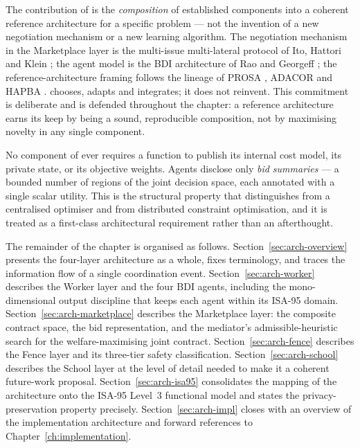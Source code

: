\begin{description}[leftmargin=1.4em,style=nextline]
  \item[Composition over invention.] The contribution of \NEXUS{} is
    the \emph{composition} of established components into a coherent
    reference architecture for a specific problem --- not the invention
    of a new negotiation mechanism or a new learning algorithm. The
    negotiation mechanism in the Marketplace layer is the multi-issue
    multi-lateral protocol of Ito, Hattori and Klein
    \cite{ito2007multiissue}; the agent model is the BDI architecture
    of Rao and Georgeff \cite{rao1995bdi}; the reference-architecture
    framing follows the lineage of PROSA \cite{vanbrussel1998prosa},
    ADACOR \cite{leitao2007holonic} and HAPBA \cite{leitao2015hapba}.
    \NEXUS{} chooses, adapts and integrates; it does not reinvent. This
    commitment is deliberate and is defended throughout the chapter:
    a reference architecture earns its keep by being a sound,
    reproducible composition, not by maximising novelty in any single
    component.
  \item[Bounded information disclosure.] No component of \NEXUS{} ever
    requires a function to publish its internal cost model, its private
    state, or its objective weights. Agents disclose only
    \emph{bid summaries} --- a bounded number of regions of the joint
    decision space, each annotated with a single scalar utility. This
    is the structural property that distinguishes \NEXUS{} from a
    centralised optimiser and from distributed constraint optimisation,
    and it is treated as a first-class architectural requirement rather
    than an afterthought.
\end{description}

The remainder of the chapter is organised as follows.
Section~\ref{sec:arch-overview} presents the four-layer architecture as
a whole, fixes terminology, and traces the information flow of a single
coordination event. Section~\ref{sec:arch-worker} describes the Worker
layer and the four BDI agents, including the mono-dimensional output
discipline that keeps each agent within its ISA-95 domain.
Section~\ref{sec:arch-marketplace} describes the Marketplace layer: the
composite contract space, the bid representation, and the mediator's
admissible-heuristic search for the welfare-maximising joint contract.
Section~\ref{sec:arch-fence} describes the Fence layer and its
three-tier safety classification. Section~\ref{sec:arch-school}
describes the School layer at the level of detail needed to make it a
coherent future-work proposal. Section~\ref{sec:arch-isa95} consolidates
the mapping of the architecture onto the ISA-95 Level~3 functional model
and states the privacy-preservation property precisely.
Section~\ref{sec:arch-impl} closes with an overview of the
implementation architecture and forward references to
Chapter~\ref{ch:implementation}.

